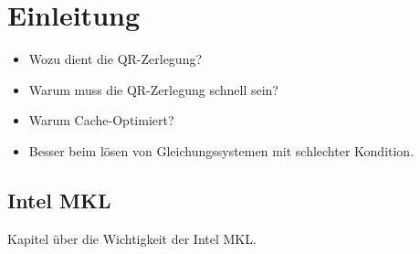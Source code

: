 \chapter{Einleitung}

\begin{itemize}
	\item Wozu dient die QR-Zerlegung?
	
	\item Warum muss die QR-Zerlegung schnell sein?
	
	\item Warum Cache-Optimiert?
	
	\item Besser beim lösen von Gleichungssystemen mit schlechter Kondition.
\end{itemize}


\section{Intel MKL}

Kapitel über die Wichtigkeit der Intel MKL.

